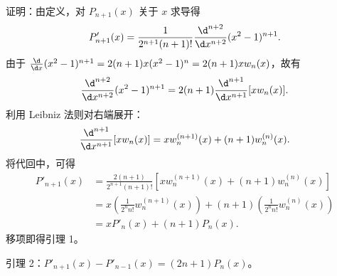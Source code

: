 \begin{myproof}
    证明：由定义，对 $P_{n+1}(x)$ 关于 $x$ 求导得
    \begin{equation}\label{eq:lemma1-step1}
        P'_{n+1}(x) = \frac{1}{2^{n+1}(n+1)!} \frac{\d^{n+2}}{\d x^{n+2}} (x^2 - 1)^{n+1}.
    \end{equation}
    由于 $\frac{\d}{\d x} (x^2 - 1)^{n+1} = 2(n+1)x (x^2 - 1)^n = 2(n+1) x w_n(x)$，故有
    \begin{equation}\label{eq:lemma1-step2}
        \frac{\d^{n+2}}{\d x^{n+2}} (x^2 - 1)^{n+1} = 2(n+1) \frac{\d^{n+1}}{\d x^{n+1}} [ x w_n(x) ].
    \end{equation}
    利用 Leibniz 法则对右端展开：
    \begin{equation}\label{eq:lemma1-step3}
        \frac{\d^{n+1}}{\d x^{n+1}} [ x w_n(x) ] = x w_n^{(n+1)}(x) + (n+1) w_n^{(n)}(x).
    \end{equation}
    将代回中，可得
    \begin{equation}\label{eq:lemma1-step4}
        \begin{aligned}
            P'_{n+1}(x) & = \frac{2(n+1)}{2^{n+1}(n+1)!} \left[ x w_n^{(n+1)}(x) + (n+1) w_n^{(n)}(x) \right]                     \\
                        & = x \left( \frac{1}{2^n n!} w_n^{(n+1)}(x) \right) + (n+1) \left( \frac{1}{2^n n!} w_n^{(n)}(x) \right) \\
                        & = x P'_n(x) + (n+1) P_n(x).
        \end{aligned}
    \end{equation}
    移项即得引理 1。

    引理 2：$P'_{n+1}(x) - P'_{n-1}(x) = (2n+1) P_n(x)$。


\end{myproof}
